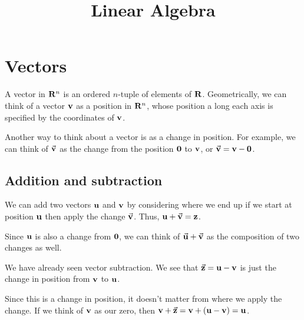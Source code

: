 \documentclass[../main.tex]{subfiles}
\title{Linear Algebra}
\author{}
\date{}
\begin{document}
\maketitle
\tableofcontents

\newpage

\section{Vectors}

A vector in \( \mathbf R^n \) is an ordered \( n \)-tuple of elements of \( \mathbf R \).
Geometrically, we can think of a vector \( \vb{v} \) as a position in \( \mathbf R^n \),
whose position a long each axis is specified by the coordinates of \( \vb{v} \).

Another way to think about a vector is as a change in position.
For example,
we can think of \( \va{v} \) as the change from the position \( \vb{0} \) to \( \vb{v} \),
or \( \va{v} = \vb{v} - \vb{0} \).

\noindent


\subsection{Addition and subtraction}

We can add two vectors \( \vb{u} \) and \( \vb{v} \)
by considering where we end up if we start at position \( \vb{u} \)
then apply the change \( \va{v} \).
Thus, \( \vb{u} + \va{v} = \vb{z} \).

\noindent


Since \( \vb{u} \) is also a change from \( \vb{0} \),
we can think of \( \va u + \va v \) as the composition of two changes as well.

We have already seen vector subtraction.
We see that \( \va{z} = \vb{u} - \vb{v} \)
is just the change in position from \( \vb{v} \) to \( \vb{u} \).

\noindent


Since this is a change in position,
it doesn't matter from where we apply the change.
If we think of \( \vb{v} \) as our zero,
then \( \vb v + \va z = \vb v + ( \vb u - \vb v ) = \vb u \).
\end{document}
